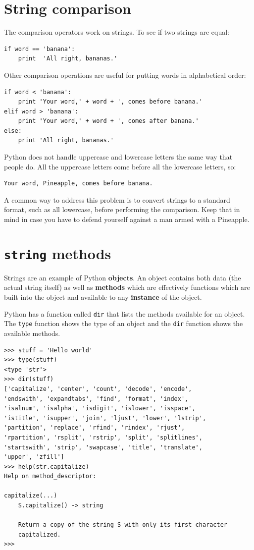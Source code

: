 \documentclass[10pt]{book}
\begin{document}
\section{String comparison}


The comparison operators work on strings.  To see if two strings are equal:

\beforeverb
\begin{verbatim}
if word == 'banana':
    print  'All right, bananas.'
\end{verbatim}
\afterverb
%
Other comparison operations are useful for putting words in alphabetical
order:

\beforeverb
\begin{verbatim}
if word < 'banana':
    print 'Your word,' + word + ', comes before banana.'
elif word > 'banana':
    print 'Your word,' + word + ', comes after banana.'
else:
    print 'All right, bananas.'
\end{verbatim}
\afterverb
%
Python does not handle uppercase and lowercase letters the same way
that people do.  All the uppercase letters come before all the
lowercase letters, so:

\beforeverb
\begin{verbatim}
Your word, Pineapple, comes before banana.
\end{verbatim}
\afterverb
%
A common way to address this problem is to convert strings to a
standard format, such as all lowercase, before performing the
comparison.  Keep that in mind in case you have to defend yourself
against a man armed with a Pineapple.


\section{{\tt string} methods}

Strings are an example of Python {\bf objects}.  An object contains
both data (the actual string itself) as well as {\bf methods} which
are effectively functions which are built into the object and 
available to any {\bf instance} of the object.

Python has a function called {\tt dir} that lists the methods available
for an object.  The {\tt type} function shows the type of an object 
and the {\tt dir} function shows the available methods.
\beforeverb
\begin{verbatim}
>>> stuff = 'Hello world'
>>> type(stuff)
<type 'str'>
>>> dir(stuff)
['capitalize', 'center', 'count', 'decode', 'encode', 
'endswith', 'expandtabs', 'find', 'format', 'index', 
'isalnum', 'isalpha', 'isdigit', 'islower', 'isspace', 
'istitle', 'isupper', 'join', 'ljust', 'lower', 'lstrip', 
'partition', 'replace', 'rfind', 'rindex', 'rjust', 
'rpartition', 'rsplit', 'rstrip', 'split', 'splitlines', 
'startswith', 'strip', 'swapcase', 'title', 'translate', 
'upper', 'zfill']
>>> help(str.capitalize)
Help on method_descriptor:

capitalize(...)
    S.capitalize() -> string
    
    Return a copy of the string S with only its first character
    capitalized.
>>>
\end{verbatim}
\afterverb
%
\end{document}
